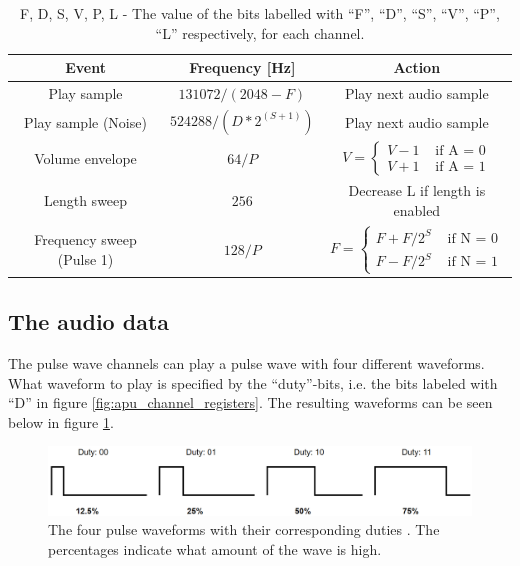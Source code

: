 \begin{table}[H]
    \centering
    \begin{tabular}{c|c|c}
        Event & Frequency [Hz] & Action \\
        \hline
        Play sample & $131072/(2048 - F)$ & Play next audio sample \\
        \hline
        Play sample (Noise) & $524288 / (D * 2 ^ {(S + 1)})$ & Play next audio sample \\
        \hline
        Volume envelope & $64/P$ & 
        $V =
        \begin{cases}
            V - 1  & \text{ if A = 0} \\
            V + 1 & \text{ if A = 1}
        \end{cases}$ \\
        \hline
        Length sweep & $256$ & Decrease L if length is enabled\\
        \hline
        Frequency sweep (Pulse 1) & $128/P$ &
        $F =
        \begin{cases}
            F + F/2^{S}  & \text{ if N = 0} \\
            F - F/2^{S} & \text{ if N = 1}
        \end{cases}$\\
    \end{tabular}
    \caption{F, D, S, V, P, L - The value of the bits labelled with ``F'', ``D'', ``S'', ``V'', ``P'', ``L'' respectively, for each channel.}
    \label{tab:frequent_events_apu}
\end{table}
        
\subsection{The audio data} \label{sec:theAudioData}
    The pulse wave channels can play a pulse wave with four different waveforms. What waveform to play is specified by the ``duty''-bits, i.e. the bits labeled with ``D'' in figure \ref{fig:apu_channel_registers}. The resulting waveforms can be seen below in figure \ref{fig:square_wave_forms}.
        
\begin{figure}[H]
    \centering
    \includegraphics[width=\textwidth]{figures/APU/square_waveforms.png}
    \caption{The four pulse waveforms with their corresponding duties \cite{AudioHardware}. The percentages indicate what amount of the wave is high.}
    \label{fig:square_wave_forms}
\end{figure}

